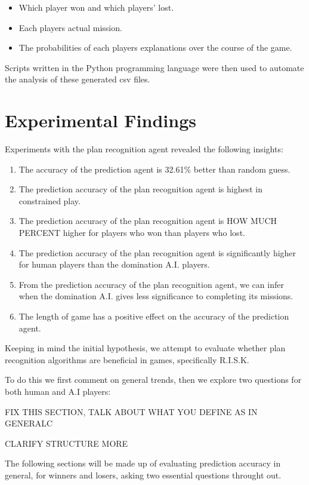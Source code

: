 \documentclass[parskip]{cs4rep}
\begin{document}
\begin{itemize}
\item
Which player won and which players' lost.
\item
Each players actual mission.
\item
The probabilities of each players explanations over the course of the game.
\end{itemize}

Scripts written in the Python programming language were then used to automate the analysis of these generated csv files.

\newpage

\section{Experimental Findings}

Experiments with the plan recognition agent revealed the following insights:

\begin{enumerate}
\item
The accuracy of the prediction agent is 32.61\% better than random guess.
\item
The prediction accuracy of the plan recognition agent is highest in constrained play. 
\item
The prediction accuracy of the plan recognition agent is HOW MUCH PERCENT higher for players who won than players who lost.
\item
The prediction accuracy of the plan recognition agent is significantly higher for human players than the domination A.I. players.
\item
From the prediction accuracy of the plan recognition agent, we can infer when the domination A.I. gives less significance to completing its missions.
\item
The length of game has a positive effect on the accuracy of the prediction agent.
\end{enumerate}

Keeping in mind the initial hypothesis, we attempt to evaluate whether plan recognition algorithms are beneficial in games, specifically R.I.S.K.

To do this we first comment on general trends, then we explore two questions for both human and A.I players:

FIX THIS SECTION, TALK ABOUT WHAT YOU DEFINE AS IN GENERALC

CLARIFY STRUCTURE MORE

The following sections will be made up of evaluating prediction accuracy in general, for winners and losers, asking two essential questions throught out.
\end{document}
